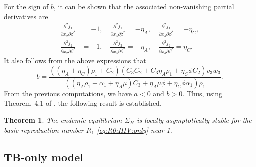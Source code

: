 \documentclass{my_aims}
\newtheorem{theorem}{Theorem}[section]
\theoremstyle{definition}
\begin{document}
For the sign of $b$, it can be shown that
the associated non-vanishing partial derivatives are
\begin{equation*}
\begin{split}
\frac{\partial^2 f_1}{\partial x_2 \partial \beta^*} &= -1,  \quad
\frac{\partial^2 f_1}{\partial x_3 \partial \beta^*} = -\eta_A, \quad
\frac{\partial^2 f_1}{\partial x_4 \partial \beta^*} = -\eta_C, \\
\frac{\partial^2 f_2}{\partial x_2 \partial \beta^*} &= -1, \quad
\frac{\partial^2 f_2}{\partial x_3 \partial \beta^*} = -\eta_A, \quad
\frac{\partial^2 f_2}{\partial x_4 \partial \beta^*} = \eta_C.
\end{split}
\end{equation*}
It also follows from the above expressions that
\begin{equation*}
b = {\frac { ((\eta_A + \eta_C) \rho_1 + C_2) \left( C_3 C_2 +C_3 \eta_A \rho_1
+ \eta_C \phi C_2 \right) v_3 w_3 }{ \left( (\eta_A \rho_1 +\alpha_1+ \eta_A \mu) C_3
+ \eta_A \mu \phi + \eta_C \phi \alpha_1 \right) \rho_1}}.
\end{equation*}
From the previous computations, we have $a < 0$ and $b > 0$.
Thus, using Theorem~4.1 of \cite{CChavez_Song_2004},
the following result is established.

\begin{theorem}
The endemic equilibrium $\Sigma_H$ is locally asymptotically stable
for the basic reproduction number $R_1$ \eqref{eq:R0:HIV:only} near 1.
\end{theorem}

\subsection{TB-only model}
\end{document}
